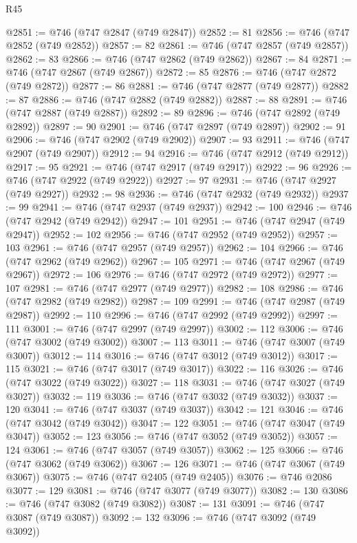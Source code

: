\begin{lexlean}{R45}
\begin{coremodule}
@2851 := @746 (@747 @2847 (@749 @2847))
@2852 := 81
@2856 := @746 (@747 @2852 (@749 @2852))
@2857 := 82
@2861 := @746 (@747 @2857 (@749 @2857))
@2862 := 83
@2866 := @746 (@747 @2862 (@749 @2862))
@2867 := 84
@2871 := @746 (@747 @2867 (@749 @2867))
@2872 := 85
@2876 := @746 (@747 @2872 (@749 @2872))
@2877 := 86
@2881 := @746 (@747 @2877 (@749 @2877))
@2882 := 87
@2886 := @746 (@747 @2882 (@749 @2882))
@2887 := 88
@2891 := @746 (@747 @2887 (@749 @2887))
@2892 := 89
@2896 := @746 (@747 @2892 (@749 @2892))
@2897 := 90
@2901 := @746 (@747 @2897 (@749 @2897))
@2902 := 91
@2906 := @746 (@747 @2902 (@749 @2902))
@2907 := 93
@2911 := @746 (@747 @2907 (@749 @2907))
@2912 := 94
@2916 := @746 (@747 @2912 (@749 @2912))
@2917 := 95
@2921 := @746 (@747 @2917 (@749 @2917))
@2922 := 96
@2926 := @746 (@747 @2922 (@749 @2922))
@2927 := 97
@2931 := @746 (@747 @2927 (@749 @2927))
@2932 := 98
@2936 := @746 (@747 @2932 (@749 @2932))
@2937 := 99
@2941 := @746 (@747 @2937 (@749 @2937))
@2942 := 100
@2946 := @746 (@747 @2942 (@749 @2942))
@2947 := 101
@2951 := @746 (@747 @2947 (@749 @2947))
@2952 := 102
@2956 := @746 (@747 @2952 (@749 @2952))
@2957 := 103
@2961 := @746 (@747 @2957 (@749 @2957))
@2962 := 104
@2966 := @746 (@747 @2962 (@749 @2962))
@2967 := 105
@2971 := @746 (@747 @2967 (@749 @2967))
@2972 := 106
@2976 := @746 (@747 @2972 (@749 @2972))
@2977 := 107
@2981 := @746 (@747 @2977 (@749 @2977))
@2982 := 108
@2986 := @746 (@747 @2982 (@749 @2982))
@2987 := 109
@2991 := @746 (@747 @2987 (@749 @2987))
@2992 := 110
@2996 := @746 (@747 @2992 (@749 @2992))
@2997 := 111
@3001 := @746 (@747 @2997 (@749 @2997))
@3002 := 112
@3006 := @746 (@747 @3002 (@749 @3002))
@3007 := 113
@3011 := @746 (@747 @3007 (@749 @3007))
@3012 := 114
@3016 := @746 (@747 @3012 (@749 @3012))
@3017 := 115
@3021 := @746 (@747 @3017 (@749 @3017))
@3022 := 116
@3026 := @746 (@747 @3022 (@749 @3022))
@3027 := 118
@3031 := @746 (@747 @3027 (@749 @3027))
@3032 := 119
@3036 := @746 (@747 @3032 (@749 @3032))
@3037 := 120
@3041 := @746 (@747 @3037 (@749 @3037))
@3042 := 121
@3046 := @746 (@747 @3042 (@749 @3042))
@3047 := 122
@3051 := @746 (@747 @3047 (@749 @3047))
@3052 := 123
@3056 := @746 (@747 @3052 (@749 @3052))
@3057 := 124
@3061 := @746 (@747 @3057 (@749 @3057))
@3062 := 125
@3066 := @746 (@747 @3062 (@749 @3062))
@3067 := 126
@3071 := @746 (@747 @3067 (@749 @3067))
@3075 := @746 (@747 @2405 (@749 @2405))
@3076 := @746 @2086
@3077 := 129
@3081 := @746 (@747 @3077 (@749 @3077))
@3082 := 130
@3086 := @746 (@747 @3082 (@749 @3082))
@3087 := 131
@3091 := @746 (@747 @3087 (@749 @3087))
@3092 := 132
@3096 := @746 (@747 @3092 (@749 @3092))

\end{coremodule}
\end{lexlean}
